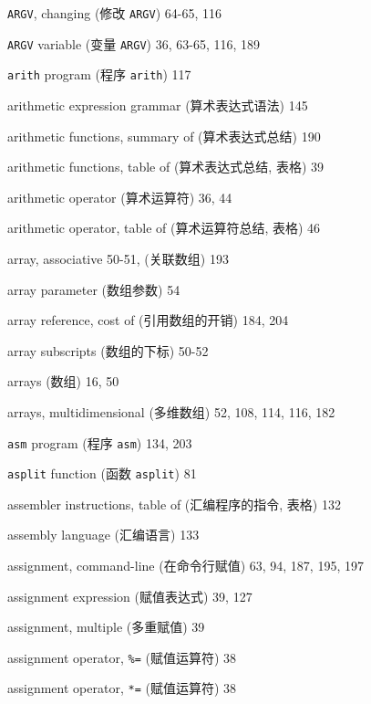 \begin{multicols}{2}
\hangindent=2pc  \verb'ARGV', changing (修改 \verb'ARGV') 64-65, 116

\hangindent=2pc  \verb'ARGV' variable (变量 \verb'ARGV') 36, 63-65, 116, 189

\hangindent=2pc  \verb'arith' program (程序 \verb'arith') 117

\hangindent=2pc  arithmetic expression grammar (算术表达式语法) 145

\hangindent=2pc  arithmetic functions, summary of
(算术表达式总结) 190

\hangindent=2pc  arithmetic functions, table of
(算术表达式总结, 表格) 39

\hangindent=2pc  arithmetic operator (算术运算符) 36, 44

\hangindent=2pc  arithmetic operator, table of (算术运算符总结,
表格) 46

\hangindent=2pc  array, associative 50-51, (关联数组) 193

\hangindent=2pc  array parameter (数组参数) 54

\hangindent=2pc  array reference, cost of (引用数组的开销) 184, 204

\hangindent=2pc  array subscripts (数组的下标) 50-52

\hangindent=2pc  arrays (数组) 16, 50

\hangindent=2pc  arrays, multidimensional (多维数组) 52, 108, 114, 116, 182

\hangindent=2pc  \verb'asm' program (程序 \verb'asm') 134, 203

\hangindent=2pc  \verb'asplit' function (函数 \verb'asplit') 81

\hangindent=2pc  assembler instructions, table of
(汇编程序的指令, 表格) 132

\hangindent=2pc  assembly language (汇编语言) 133

\hangindent=2pc  assignment, command-line (在命令行赋值) 63, 94, 187, 195, 197

\hangindent=2pc  assignment expression (赋值表达式) 39, 127

\hangindent=2pc  assignment, multiple (多重赋值) 39

\hangindent=2pc  assignment operator, \verb'%=' (赋值运算符) 38

\hangindent=2pc  assignment operator, \verb'*=' (赋值运算符) 38


\end{multicols}
